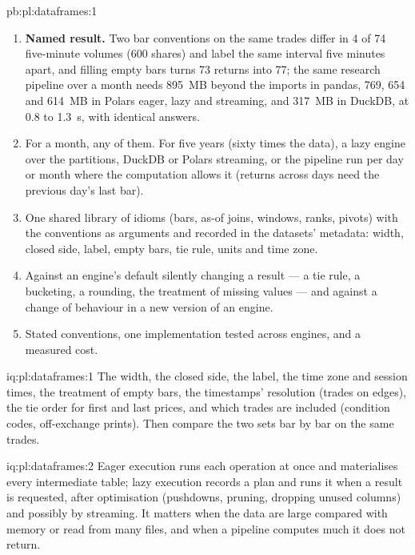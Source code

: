 \begin{solution}{pb:pl:dataframes:1}
\begin{enumerate}
it was started from.
\item \textbf{Named result.} Two bar conventions on the same trades differ in 4 of 74 five-minute volumes (600 shares) and label the same
interval five minutes apart, and filling empty bars turns 73 returns into 77; the same research pipeline over a month needs 895~MB beyond
the imports in pandas, 769, 654 and 614~MB in Polars eager, lazy and streaming, and 317~MB in DuckDB, at 0.8 to 1.3~s, with identical
answers.
\item For a month, any of them. For five years (sixty times the data), a lazy engine over the partitions, DuckDB or Polars streaming, or the
pipeline run per day or month where the computation allows it (returns across days need the previous day's last bar).
\item One shared library of idioms (bars, as-of joins, windows, ranks, pivots) with the conventions as arguments and recorded in the
datasets' metadata: width, closed side, label, empty bars, tie rule, units and time zone.
\item Against an engine's default silently changing a result --- a tie rule, a bucketing, a rounding, the treatment of missing values ---
and against a change of behaviour in a new version of an engine.
\item Stated conventions, one implementation tested across engines, and a measured cost.
\end{enumerate}
\end{solution}

\begin{solution}{iq:pl:dataframes:1}
The width, the closed side, the label, the time zone and session times, the treatment of empty bars, the timestamps' resolution (trades on
edges), the tie order for first and last prices, and which trades are included (condition codes, off-exchange prints). Then compare the two
sets bar by bar on the same trades.
\end{solution}

\begin{solution}{iq:pl:dataframes:2}
Eager execution runs each operation at once and materialises every intermediate table; lazy execution records a plan and runs it when a
result is requested, after optimisation (pushdowns, pruning, dropping unused columns) and possibly by streaming. It matters when the data
are large compared with memory or read from many files, and when a pipeline computes much it does not return.
\end{solution}

